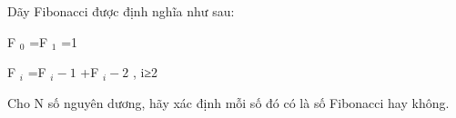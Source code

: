 Dãy Fibonacci được định nghĩa như sau:  

   F   $_    0   $   =F   $_    1   $   =1  

   F   $_    i   $   =F   $_    i-1   $   +F   $_    i-2   $   ­, i≥2  

   Cho N số nguyên dương, hãy xác định mỗi số đó có là số Fibonacci hay không.  

\